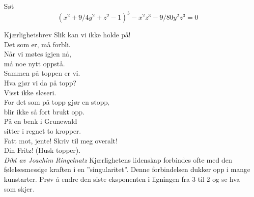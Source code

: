\begin{surferPage}{Søt}
\smallskip
\[(x^2+ 9/4y^2	+ z^2- 1)^3- x^2z^3	- 9/80y^2z^3	= 0\]

\singlespacing
Kjærlighetsbrev
\singlespacing
Slik kan vi ikke holde på!\\
Det som er, må forbli. \\
Når vi møtes igjen nå, \\
må noe nytt oppstå.\\
Sammen på toppen er vi.\\
Hva gjør vi da på topp?\\
Visst ikke sløseri.\\
For det som på topp gjør en stopp,\\
blir ikke så fort brukt opp.\\
På en benk i Grunewald\\
sitter i regnet to kropper.\\
Fatt mot, jente! Skriv til meg overalt!\\
Din Fritz! (Husk topper).\\
{\it Dikt av Joachim Ringelnatz}
\singlespacing 
Kjærlighetens lidenskap forbindes ofte med den følelsesmessige kraften i en ''singularitet''. Denne forbindelsen dukker opp i mange kunstarter.
\singlespacing 
Prøv å endre den siste eksponenten i ligningen fra 3 til 2 og se hva som skjer.
\end{surferPage}
